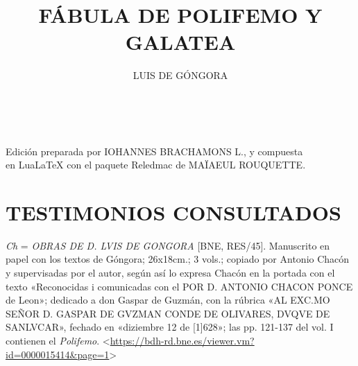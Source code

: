 \documentclass[11pt,a4paper,twoside]{article}
\title{FÁBULA DE POLIFEMO Y GALATEA}
\author{\fontsize{14}{11.96}\selectfont LUIS DE GÓNGORA}
\date{\vspace{60pt}\fontsize{11}{11}\selectfont{TEXTO Y VARIANTES DE LA REDACCIÓN PRIMITIVA}\\\fontsize{40}{11}\selectfont{\vfill\LaTeX}}
\begin{document}
	{
			\maketitle
		}
		\newpage%

\hskip0pt
\vfill
\begin{flushright}
	Edición preparada por {\fontsize{9}{1}\selectfont IOHANNES BRACHAMONS L}., y compuesta\\ en LuaLaTeX con el paquete Reledmac de {\fontsize{9}{11}\selectfont MAÏAEUL ROUQUETTE}.
\end{flushright}
\newpage
%
\tableofcontents
\newpage
%
\setcounter{page}{1}
\section*{\centering\fontsize{11}{14}\selectfont TESTIMONIOS CONSULTADOS}

\textit{Ch} = \textit{\fontsize{9}{11}\selectfont OBRAS DE D. LVIS DE GONGORA} [BNE, RES/45].
%
Manuscrito en papel con los textos de Góngora; 26x18cm.; 3 vols.; copiado por Antonio Chacón y supervisadas por el autor, según así lo expresa Chacón en la portada con el texto «Reconocidas i comunicadas con el {\fontsize{9}{11}\selectfont POR D. ANTONIO CHACON PONCE} de Leon»; dedicado a don Gaspar de Guzmán, con la rúbrica «{\fontsize{9}{11}\selectfont AL EXC.MO SEÑOR D. GASPAR DE GVZMAN CONDE DE OLIVARES, DVQVE DE SANLVCAR}», fechado en «diziembre 12 de [1]628»; las pp. 121-137 del vol. I contienen el \textit{Polifemo}. <\url{https://bdh-rd.bne.es/viewer.vm?id=0000015414&page=1}>\par
\end{document}
